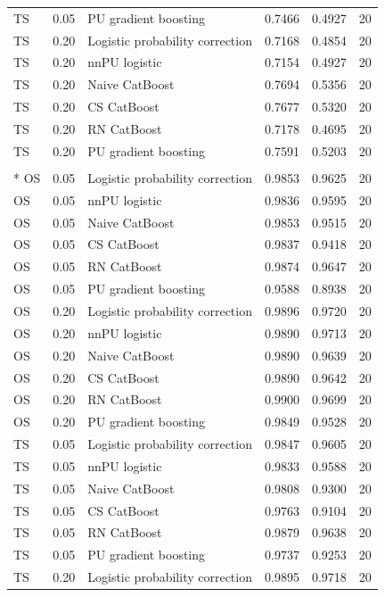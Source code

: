\begin{longtable}{@{}p{0.65in}rp{2.85in}rrr@{}}
TS & 0.05 & PU gradient boosting & 0.7466 & 0.4927 & 20 \\
\addlinespace[2pt]
TS & 0.20 & Logistic probability correction & 0.7168 & 0.4854 & 20 \\
TS & 0.20 & nnPU logistic & 0.7154 & 0.4927 & 20 \\
TS & 0.20 & Naive CatBoost & 0.7694 & 0.5356 & 20 \\
TS & 0.20 & CS CatBoost & 0.7677 & 0.5320 & 20 \\
TS & 0.20 & RN CatBoost & 0.7178 & 0.4695 & 20 \\
TS & 0.20 & PU gradient boosting & 0.7591 & 0.5203 & 20 \\
\addlinespace[2pt]
\multicolumn{6}{l}{\textbf{Dry Bean}}\\*
OS & 0.05 & Logistic probability correction & 0.9853 & 0.9625 & 20 \\
OS & 0.05 & nnPU logistic & 0.9836 & 0.9595 & 20 \\
OS & 0.05 & Naive CatBoost & 0.9853 & 0.9515 & 20 \\
OS & 0.05 & CS CatBoost & 0.9837 & 0.9418 & 20 \\
OS & 0.05 & RN CatBoost & 0.9874 & 0.9647 & 20 \\
OS & 0.05 & PU gradient boosting & 0.9588 & 0.8938 & 20 \\
\addlinespace[2pt]
OS & 0.20 & Logistic probability correction & 0.9896 & 0.9720 & 20 \\
OS & 0.20 & nnPU logistic & 0.9890 & 0.9713 & 20 \\
OS & 0.20 & Naive CatBoost & 0.9890 & 0.9639 & 20 \\
OS & 0.20 & CS CatBoost & 0.9890 & 0.9642 & 20 \\
OS & 0.20 & RN CatBoost & 0.9900 & 0.9699 & 20 \\
OS & 0.20 & PU gradient boosting & 0.9849 & 0.9528 & 20 \\
\addlinespace[2pt]
TS & 0.05 & Logistic probability correction & 0.9847 & 0.9605 & 20 \\
TS & 0.05 & nnPU logistic & 0.9833 & 0.9588 & 20 \\
TS & 0.05 & Naive CatBoost & 0.9808 & 0.9300 & 20 \\
TS & 0.05 & CS CatBoost & 0.9763 & 0.9104 & 20 \\
TS & 0.05 & RN CatBoost & 0.9879 & 0.9638 & 20 \\
TS & 0.05 & PU gradient boosting & 0.9737 & 0.9253 & 20 \\
\addlinespace[2pt]
TS & 0.20 & Logistic probability correction & 0.9895 & 0.9718 & 20 \\

\end{longtable}
